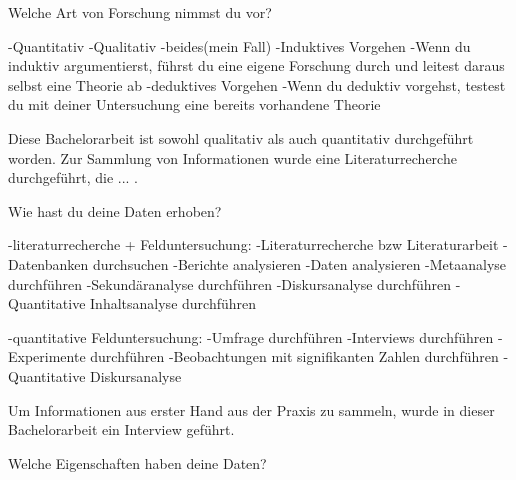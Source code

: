     Welche Art von Forschung nimmst du vor?
        
        -Quantitativ
        -Qualitativ
        -beides(mein Fall)
        -Induktives Vorgehen
            -Wenn du induktiv argumentierst, führst du eine eigene Forschung durch und leitest daraus selbst eine Theorie ab
        -deduktives Vorgehen    
            -Wenn du deduktiv vorgehst, testest du mit deiner Untersuchung eine bereits vorhandene Theorie

Diese Bachelorarbeit ist sowohl qualitativ als auch quantitativ durchgeführt worden. Zur Sammlung von Informationen wurde eine Literaturrecherche durchgeführt, die ... . 

    Wie hast du deine Daten erhoben?
    
        -literaturrecherche + Felduntersuchung:
        -Literaturrecherche bzw Literaturarbeit
            -Datenbanken durchsuchen
            -Berichte analysieren
            -Daten analysieren
            -Metaanalyse durchführen
            -Sekundäranalyse durchführen
            -Diskursanalyse durchführen
            -Quantitative Inhaltsanalyse durchführen

        -quantitative Felduntersuchung:
            -Umfrage durchführen
            -Interviews durchführen
            -Experimente durchführen
            -Beobachtungen mit signifikanten Zahlen durchführen
            -Quantitative Diskursanalyse
            
Um Informationen aus erster Hand aus der Praxis zu sammeln, wurde in dieser Bachelorarbeit ein Interview geführt. 

    Welche Eigenschaften haben deine Daten?
    
